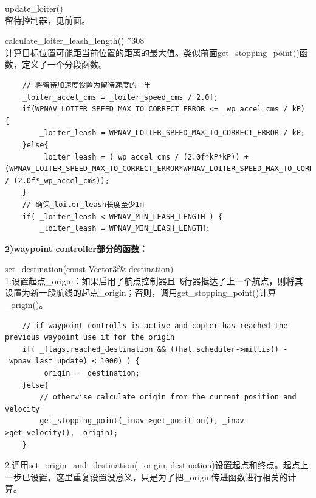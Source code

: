 \documentclass[a4paper,10pt]{ctexart} %
\begin{document}
\vspace{8pt}
\noindent update\_loiter()\\
留待控制器，见前面。

\vspace{8pt}
\noindent calculate\_loiter\_leash\_length() {\color{red}*308}\\
计算目标位置可能距当前位置的距离的最大值。类似前面get\_stopping\_point()函数，定义了一个分段函数。
\begin{lstlisting}
    // 将留待加速度设置为留待速度的一半
    _loiter_accel_cms = _loiter_speed_cms / 2.0f;
    if(WPNAV_LOITER_SPEED_MAX_TO_CORRECT_ERROR <= _wp_accel_cms / kP) {
        _loiter_leash = WPNAV_LOITER_SPEED_MAX_TO_CORRECT_ERROR / kP;
    }else{
        _loiter_leash = (_wp_accel_cms / (2.0f*kP*kP)) + (WPNAV_LOITER_SPEED_MAX_TO_CORRECT_ERROR*WPNAV_LOITER_SPEED_MAX_TO_CORRECT_ERROR / (2.0f*_wp_accel_cms));
    }
    // 确保_loiter_leash长度至少1m
    if( _loiter_leash < WPNAV_MIN_LEASH_LENGTH ) {
        _loiter_leash = WPNAV_MIN_LEASH_LENGTH;
\end{lstlisting}



\vspace{20pt}
\noindent \textbf{\large 2)waypoint controller部分的函数：}

\noindent set\_destination(const Vector3f\& destination)\\
1.设置起点\_origin：如果启用了航点控制器且飞行器抵达了上一个航点，则将其设置为新一段航线的起点\_origin；否则，调用get\_stopping\_point()计算\_origin()。
\begin{lstlisting}
    // if waypoint controlls is active and copter has reached the previous waypoint use it for the origin
    if( _flags.reached_destination && ((hal.scheduler->millis() - _wpnav_last_update) < 1000) ) {
        _origin = _destination;
    }else{
        // otherwise calculate origin from the current position and velocity
        get_stopping_point(_inav->get_position(), _inav->get_velocity(), _origin);
    }
\end{lstlisting}
2.调用set\_origin\_and\_destination(\_origin, destination)设置起点和终点。起点上一步已设置，这里重复设置没意义，只是为了把\_origin传进函数进行相关的计算。
\end{document}
